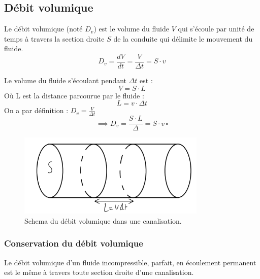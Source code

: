 \subsection{Débit volumique}



\begin{definition}\label{def:Dv}
    Le débit volumique (noté \(D_{v}\)) est le volume du fluide \(V\) qui s'écoule par unité de temps à travers la section droite \(S\) de la conduite qui délimite le mouvement du fluide.
    \[
        D_{v} = \frac{dV}{dt} = \frac{V}{\Delta t} = S \cdot v 
    \] 
\end{definition}

\begin{explanation}

    Le volume du fluide s'écoulant pendant \(\Delta t\) est : 
    \[
        V = S \cdot L
    \]
    Où L est la distance parcourue par le fluide :
    \[
        L = v \cdot \Delta t
    \]
    On a par définition : \(D_{v} = \frac{V}{\Delta t}\)
    \[
        \implies D_{v} = \frac{S \cdot L}{\Delta} = S \cdot v \, \square  
    \]
\end{explanation}

\begin{figure}[!htb]
    \centering
    \includegraphics[width=0.8\textwidth]{SchemaDv.png}
    \caption{Schema du débit volumique dans une canalisation.}
    \label{fig:SchemaDv}
\end{figure}

\subsubsection{Conservation du débit volumique}

\begin{theorem}\label{thm:consdebitvol}
    Le débit volumique d'un fluide incompressible, parfait, en écoulement permanent est le même à travers toute section droite d'une canalisation.
\end{theorem}

